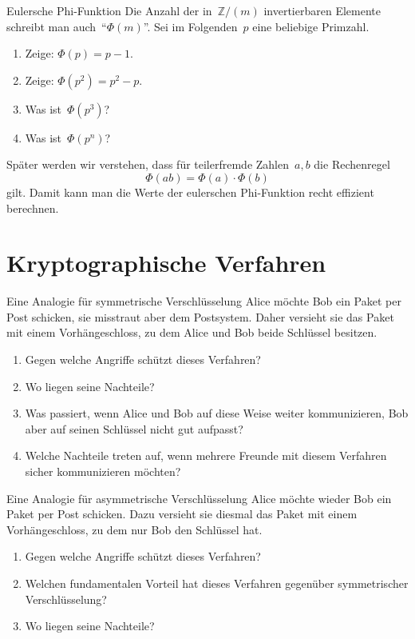 \documentclass{../zirkelblatt}
\newcommand{\head}[1]{\section*{\rmfamily #1}}%
\newcommand{\ZZ}{\mathbb{Z}}
\begin{document}
\newpage
\begin{aufgabe}{Eulersche Phi-Funktion}
Die Anzahl der in~$\ZZ/(m)$ invertierbaren Elemente schreibt man
auch~"`$\Phi(m)$"'. Sei im Folgenden~$p$ eine beliebige Primzahl.
\begin{enumerate}
\item Zeige: $\Phi(p) = p - 1$.
\item Zeige: $\Phi(p^2) = p^2 - p$.
\item Was ist~$\Phi(p^3)$?
\item Was ist~$\Phi(p^n)$?
\end{enumerate}
Später werden wir verstehen, dass für teilerfremde Zahlen~$a,b$ die Rechenregel
\[ \Phi(ab) = \Phi(a) \cdot \Phi(b) \]
gilt. Damit kann man die Werte der eulerschen Phi-Funktion recht effizient
berechnen.
\end{aufgabe}


\head{Kryptographische Verfahren}

\begin{aufgabe}{Eine Analogie für symmetrische Verschlüsselung}
Alice möchte Bob ein Paket per Post schicken, sie misstraut aber dem
Postsystem. Daher versieht sie das Paket mit einem Vorhängeschloss, zu dem
Alice und Bob beide Schlüssel besitzen.
\begin{enumerate}
\item Gegen welche Angriffe schützt dieses Verfahren?
\item Wo liegen seine Nachteile?
\item Was passiert, wenn Alice und Bob auf diese Weise weiter kommunizieren,
Bob aber auf seinen Schlüssel nicht gut aufpasst?
\item Welche Nachteile treten auf, wenn mehrere Freunde mit diesem Verfahren
sicher kommunizieren möchten?
\end{enumerate}
\end{aufgabe}

\begin{aufgabe}{Eine Analogie für asymmetrische Verschlüsselung}
Alice möchte wieder Bob ein Paket per Post schicken. Dazu versieht sie diesmal
das Paket mit einem Vorhängeschloss, zu dem nur Bob den Schlüssel hat.
\begin{enumerate}
\item Gegen welche Angriffe schützt dieses Verfahren?
\item Welchen fundamentalen Vorteil hat dieses Verfahren gegenüber symmetrischer
Verschlüsselung?
\item Wo liegen seine Nachteile?
\end{enumerate}
\end{aufgabe}
\end{document}
